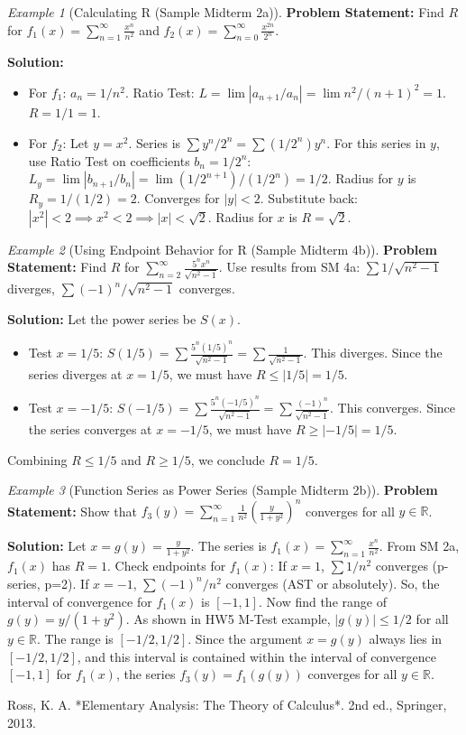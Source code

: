 \documentclass{article}
\theoremstyle{definition}
\theoremstyle{plain}
\theoremstyle{remark}
\newtheorem{example}{Example}[section]
\newcommand{\R}{\mathbb{R}}
\begin{document}
\begin{example}[Calculating R (Sample Midterm 2a)]
\textbf{Problem Statement:} Find \(R\) for \(f_1(x)=\sum_{n=1}^\infty \frac{x^n}{n^2}\) and \(f_2(x)=\sum_{n=0}^\infty \frac{x^{2n}}{2^n}\).

\textbf{Solution:}
\begin{itemize}
    \item For \(f_1\): \(a_n=1/n^2\). Ratio Test: \(L = \lim |a_{n+1}/a_n| = \lim n^2/(n+1)^2 = 1\). \(R=1/1=1\).
    \item For \(f_2\): Let \(y=x^2\). Series is \(\sum y^n / 2^n = \sum (1/2^n) y^n\). For this series in \(y\), use Ratio Test on coefficients \(b_n=1/2^n\): \(L_y = \lim |b_{n+1}/b_n| = \lim (1/2^{n+1})/(1/2^n) = 1/2\). Radius for \(y\) is \(R_y=1/(1/2)=2\). Converges for \(|y|<2\). Substitute back: \(|x^2|<2 \implies x^2<2 \implies |x|<\sqrt{2}\). Radius for \(x\) is \(R=\sqrt{2}\).
\end{itemize}
\end{example}

\begin{example}[Using Endpoint Behavior for R (Sample Midterm 4b)]
\textbf{Problem Statement:} Find \(R\) for \(\sum_{n=2}^\infty \frac{5^n x^n}{\sqrt{n^2-1}}\). Use results from SM 4a: \(\sum 1/\sqrt{n^2-1}\) diverges, \(\sum (-1)^n/\sqrt{n^2-1}\) converges.

\textbf{Solution:} Let the power series be \(S(x)\).
\begin{itemize}
    \item Test \(x=1/5\): \(S(1/5) = \sum \frac{5^n (1/5)^n}{\sqrt{n^2-1}} = \sum \frac{1}{\sqrt{n^2-1}}\). This diverges. Since the series diverges at \(x=1/5\), we must have \(R \le |1/5| = 1/5\).
    \item Test \(x=-1/5\): \(S(-1/5) = \sum \frac{5^n (-1/5)^n}{\sqrt{n^2-1}} = \sum \frac{(-1)^n}{\sqrt{n^2-1}}\). This converges. Since the series converges at \(x=-1/5\), we must have \(R \ge |-1/5| = 1/5\).
\end{itemize}
Combining \(R \le 1/5\) and \(R \ge 1/5\), we conclude \(R=1/5\).
\end{example}

\begin{example}[Function Series as Power Series (Sample Midterm 2b)]
\textbf{Problem Statement:} Show that \(f_3(y)=\sum_{n=1}^\infty \frac{1}{n^2} \left( \frac{y}{1+y^2}\right)^n\) converges for all \(y\in \R\).

\textbf{Solution:} Let \(x = g(y) = \frac{y}{1+y^2}\). The series is \(f_1(x) = \sum_{n=1}^\infty \frac{x^n}{n^2}\).
From SM 2a, \(f_1(x)\) has \(R=1\).
Check endpoints for \(f_1(x)\):
If \(x=1\), \(\sum 1/n^2\) converges (p-series, p=2).
If \(x=-1\), \(\sum (-1)^n/n^2\) converges (AST or absolutely).
So, the interval of convergence for \(f_1(x)\) is \([-1, 1]\).
Now find the range of \(g(y) = y/(1+y^2)\). As shown in HW5 M-Test example, \(|g(y)| \le 1/2\) for all \(y \in \R\). The range is \([-1/2, 1/2]\).
Since the argument \(x = g(y)\) always lies in \([-1/2, 1/2]\), and this interval is contained within the interval of convergence \([-1, 1]\) for \(f_1(x)\), the series \(f_3(y) = f_1(g(y))\) converges for all \(y \in \R\).
\end{example}

\begin{thebibliography}{99}
 Ross, K. A. *Elementary Analysis: The Theory of Calculus*. 2nd ed., Springer, 2013.
\end{thebibliography}
\end{document}
